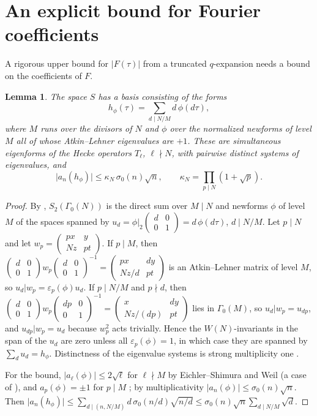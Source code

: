 \documentclass[11pt]{amsart}
\newtheorem{lemma}[theorem]{Lemma}
\theoremstyle{definition}
\theoremstyle{remark}
\newcommand{\sz}{\sigma_0}
\newcommand{\smat}[4]{\left(\begin{smallmatrix}#1&#2\\#3&#4\end{smallmatrix}\right)}
\begin{document}
\section{An explicit bound for Fourier coefficients}\label{sec:tail}

A rigorous upper bound for $\lvert F(\tau)\rvert$ from a truncated $q$-expansion
needs a bound on the coefficients of $F$.

\begin{lemma}\label{lem:star-basis}
The space $S$ has a basis consisting of the forms
\[
h_\phi(\tau)=\sum_{d\mid N/M}d\,\phi(d\tau),
\]
where $M$ runs over the divisors of $N$ and $\phi$ over the normalized newforms
of level $M$ all of whose Atkin--Lehner eigenvalues are $+1$.  These are
simultaneous eigenforms of the Hecke operators $T_\ell$, $\ell\nmid N$, with
pairwise distinct systems of eigenvalues, and
\[
\lvert a_n(h_\phi)\rvert\le\kappa_N\,\sz(n)\sqrt n,\qquad
\kappa_N=\prod_{p\mid N}(1+\sqrt p).
\]
\end{lemma}
\begin{proof}
By \cite[Thm.~5]{AL}, $S_2(\Gamma_0(N))$ is the direct sum over $M\mid N$ and
newforms $\phi$ of level $M$ of the spaces spanned by
$u_d=\phi|_2\smat d001=d\,\phi(d\tau)$, $d\mid N/M$.  Let $p\mid N$ and let
$w_p=\smat{px}{y}{Nz}{pt}$.  If $p\mid M$, then
$\smat d001w_p\smat d001^{-1}=\smat{px}{dy}{Nz/d}{pt}$ is an Atkin--Lehner matrix
of level $M$, so $u_d|w_p=\varepsilon_p(\phi)u_d$.  If $p\mid N/M$ and
$p\nmid d$, then $\smat d001w_p\smat{dp}001^{-1}=\smat{x}{dy}{Nz/(dp)}{pt}$ lies
in $\Gamma_0(M)$, so $u_d|w_p=u_{dp}$, and $u_{dp}|w_p=u_d$ because $w_p^2$ acts trivially.  Hence the
$W(N)$-invariants in the span of the $u_d$ are zero unless all
$\varepsilon_p(\phi)=1$, in which case they are spanned by $\sum_du_d=h_\phi$.
Distinctness of the eigenvalue systems is strong multiplicity one \cite[Thm.~4]{AL}.

For the bound, $\lvert a_\ell(\phi)\rvert\le2\sqrt\ell$ for $\ell\nmid M$ by
Eichler--Shimura and Weil \cite[Ch.~7]{Shimura} (a case of \cite{Deligne}), and
$a_p(\phi)=\pm1$ for $p\mid M$ \cite[Thm.~3]{AL}; by multiplicativity
$\lvert a_n(\phi)\rvert\le\sz(n)\sqrt n$.  Then
$\lvert a_n(h_\phi)\rvert\le\sum_{d\mid(n,N/M)}d\,\sz(n/d)\sqrt{n/d}
\le\sz(n)\sqrt n\sum_{d\mid N/M}\sqrt d$.
\end{proof}
\end{document}
